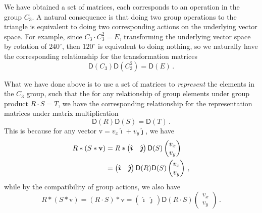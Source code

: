 \documentclass{article}
\theoremstyle{plain}\theoremheaderfont{\normalfont\itshape}\theorembodyfont{\rmfamily}\theoremseparator{.}\newtheorem*{rem}{Remark}\newtheorem*{ex}{Example}\newtheorem*{proof}{Proof}\newtheorem*{altp}{Alternative proof}
\theoremstyle{plain}\theoremheaderfont{\normalfont\bfseries}\theorembodyfont{\rmfamily}\theoremseparator{.}\newtheorem{thm}{Theorem}[section]\newtheorem{lem}[thm]{Lemma}\newtheorem{prop}[thm]{Proposition}\newtheorem*{cor}{Corollary}\newtheorem{defn}[thm]{Definition}\newtheorem{clm}[thm]{Claim}\newtheorem{clminproof}{Claim}\newtheorem*{law}{Law}\newtheorem{pos}[thm]{Postulate}
\theoremstyle{break}\theoremheaderfont{\normalfont\itshape}\theorembodyfont{\rmfamily}\theoremseparator{.\medskip}\newtheorem*{proofskip}{Proof}\newtheorem*{exs}{Examples}\newtheorem*{rems}{Remarks}
\theoremstyle{break}\theoremheaderfont{\normalfont\bfseries}\theorembodyfont{\rmfamily}\theoremseparator{.\medskip}\newtheorem{lemskip}[thm]{Lemma}\newtheorem{defnskip}[thm]{Definition}\newtheorem{propskip}[thm]{Proposition}\newtheorem{thmskip}[thm]{Theorem}
\numberwithin{equation}{section}
\newcommand{\vb}[1]{\bm{\mathrm{#1}}}
\newcommand{\vu}[1]{\hat{\bm{\mathrm{#1}}}}
\newcommand{\DD}{\mathsf{D}}
\begin{document}
    We have obtained a set of matrices, each corresponds to an operation in the group \(C_3\). A natural consequence is that doing two group operations to the triangle is equivalent to doing two corresponding actions on the underlying vector space. For example, since \(C_3\cdot C_3^2=E\), transforming the underlying vector space by rotation of \(240^\circ\), then \(120^\circ\) is equivalent to doing nothing, so we naturally have the corresponding relationship for the transformation matrices
    \begin{equation}
        \DD(C_3)\DD(C_3^2)=\DD(E)\,.
    \end{equation}

    What we have done above is to use a set of matrices to \textit{represent} the elements in the \(C_3\) group, such that the for any relationship of group elements under group product \(R\cdot S=T\), we have the corresponding relationship for the representation matrices under matrix multiplication
    \begin{equation}
        \DD(R)\DD(S)=\DD(T)\,.
    \end{equation}
    This is because for any vector \(\vb{v}=v_x\vu{\imath}+v_y\vu{\jmath}\), we have
    \begin{align}
        R*(S*\vb{v})&=R*\begin{pmatrix}
            \vu{\imath} & \vu{\jmath}
        \end{pmatrix}\DD(S)\begin{pmatrix}
            v_x \\ v_y
        \end{pmatrix}\notag\\
        &=\begin{pmatrix}
            \vu{\imath} & \vu{\jmath}
        \end{pmatrix}\DD(R)\DD(S)\begin{pmatrix}
            v_x \\ v_y
        \end{pmatrix}\,,
    \end{align}
    while by the compatibility of group actions, we also have
    \begin{equation}
        R*(S*\vb{v})=(R\cdot S)*\vb{v}=\begin{pmatrix}
            \vu{\imath} & \vu{\jmath}
        \end{pmatrix}\DD(R\cdot S)\begin{pmatrix}
            v_x \\ v_y
        \end{pmatrix}\,.
    \end{equation}
\end{document}
